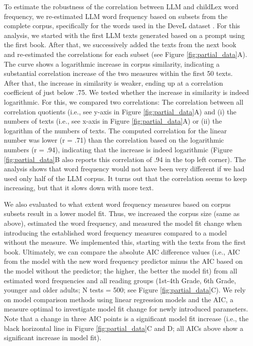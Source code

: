 \documentclass[manuscript]{stjour}
\begin{document}
To estimate the robustness of the correlation between LLM and childLex word frequency, we re-estimated LLM word frequency based on subsets from the complete corpus, specifically for the words used in the DeveL dataset \citep{schroter_developmental_2017}. For this analysis, we started with the first LLM texts generated based on a prompt using the first book. After that, we successively added the texts from the next book and re-estimated the correlations for each subset (see Figure \ref{fig:partial_data}A). The curve shows a logarithmic increase in corpus similarity, indicating a substantial correlation increase of the two measures within the first 50 texts. After that, the increase in similarity is weaker, ending up at a correlation coefficient of just below .75. We tested whether the increase in similarity is indeed logarithmic. For this, we compared two correlations: The correlation between all correlation quotients (i.e., see y-axis in Figure \ref{fig:partial_data}A) and (i) the numbers of texts (i.e., see x-axis in Figure \ref{fig:partial_data}A) or (ii) the logarithm of the numbers of texts. The computed correlation for the linear number was lower (r = .71) than the correlation based on the logarithmic numbers (r = .94), indicating that the increase is indeed logarithmic  (Figure \ref{fig:partial_data}B also reports this correlation of .94 in the top left corner). The analysis shows that word frequency would not have been very different if we had used only half of the LLM corpus. It turns out that the correlation seems to keep increasing, but that it slows down with more text. 

We also evaluated to what extent word frequency measures based on corpus subsets result in a lower model fit. Thus, we increased the corpus size (same as above), estimated the word frequency, and measured the model fit change when introducing the established word frequency measures compared to a model without the measure. We implemented this, starting with the texts from the first book. Ultimately, we can compare the absolute AIC difference values (i.e., AIC from the model with the new word frequency predictor minus the AIC based on the model without the predictor; the higher, the better the model fit) from all estimated word frequencies and all reading groups (1st-4th Grade, 6th Grade, younger and older adults; N tests = 500; see Figure \ref{fig:partial_data}C). We rely on model comparison methods using linear regression models and the AIC, a measure optimal to investigate model fit change for newly introduced parameters. Note that a change in three AIC points is a significant model fit increase (i.e., the black horizontal line in Figure \ref{fig:partial_data}C and D; all AICs above show a significant increase in model fit).
\end{document}
